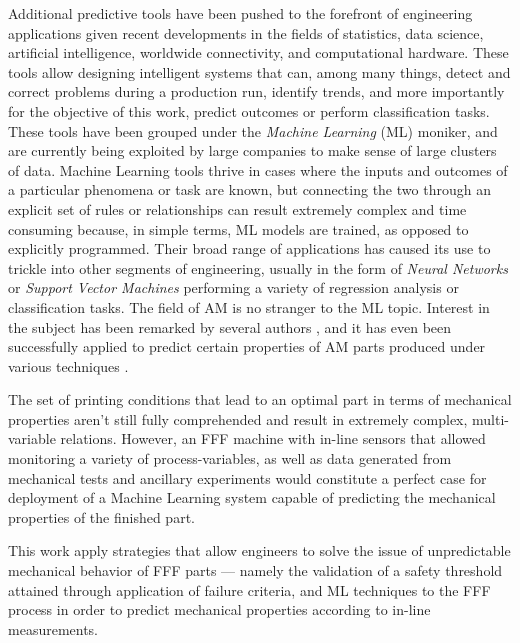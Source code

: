 \documentclass[main.tex]{subfiles}
\begin{document}
Additional predictive tools have been pushed to the forefront of engineering applications given recent developments in the fields of statistics, data science, artificial intelligence, worldwide connectivity, and computational hardware. These tools allow designing intelligent systems that can, among many things, detect and correct problems during a production run, identify trends, and more importantly for the objective of this work, predict outcomes or perform classification tasks. These tools have been grouped under the \emph{Machine Learning} (ML) moniker, and are currently being exploited by large companies to make sense of large clusters of data. Machine Learning tools thrive in cases where the inputs and outcomes of a particular phenomena or task are known, but connecting the two through an explicit set of rules or relationships can result extremely complex and time consuming \cite{Chollet2018} because, in simple terms, ML models are trained, as opposed to explicitly programmed. Their broad range of applications has caused its use to trickle into other segments of engineering, usually in the form of \emph{Neural Networks} or \emph{Support Vector Machines} performing a variety of regression analysis or classification tasks. The field of AM is no stranger to the ML topic. Interest in the subject has been remarked by several authors \cite{Qi2019, Razvi2019, Meng2020}, and it has even been successfully applied to predict certain properties of AM parts produced under various techniques \cite{Qi2019, Razvi2019, Meng2020, Sood2012}. 

The set of printing conditions that lead to an optimal part in terms of mechanical properties aren't still fully comprehended and result in extremely complex, multi-variable relations. However, an FFF machine with in-line sensors that allowed monitoring a variety of process-variables, as well as data generated from mechanical tests and ancillary experiments would constitute a perfect case for deployment of a Machine Learning system capable of predicting the mechanical properties of the finished part.

This work apply strategies that allow engineers to solve the issue of unpredictable mechanical behavior of FFF parts --- namely the validation of a safety threshold attained through application of failure criteria, and ML techniques to the FFF process in order to predict mechanical properties according to in-line measurements.

% 
%
%
%
%
%
%
%
\end{document}
